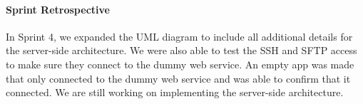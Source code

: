 \paragraph{Sprint Retrospective}
In Sprint 4, we expanded the UML diagram to include all additional details for the server-side architecture. We were also able to test the SSH and SFTP access to make sure they connect to the dummy web service. An empty app was made that only connected to the dummy web service and was able to confirm that it connected. We are still working on implementing the server-side architecture.
